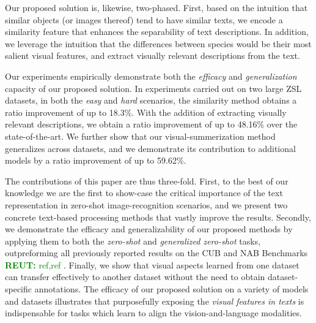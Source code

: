 \documentclass[11pt,a4paper]{article}
\newcommand\gal[1]{\textcolor{bright}{\textbf{GAL:} #1 }}
\newcommand\reut[1]{\textcolor{green}{\textbf{REUT:} #1 }}
\begin{document}
Our proposed solution is, likewise, two-phased. First,
based on the intuition that similar objects (or images thereof) tend to have similar texts,  %
we encode a similarity feature that  enhances the separability of  text descriptions. %
In addition, we leverage the intuition that the differences between species would be their most salient visual features, and extract visually relevant  descriptions from the text.



Our experiments empirically demonstrate both the {\em efficacy} and  {\em generalization} capacity of our proposed solution. 
In experiments carried out on two large ZSL datasets, %
in both the {\em easy} and {\em hard} scenarios, the similarity method obtains a ratio improvement of up to 18.3\%. With the addition of extracting visually relevant descriptions, we obtain a ratio improvement of up to 48.16\% over the state-of-the-art.
We further show that our visual-summerization method generalizes across datasets, and we demonstrate its contribution to additional models by a ratio improvement of up to 59.62\%.



The contributions of this paper are thus three-fold.
First,  to the best of our knowledge we are the first to show-case the critical importance of the text representation in zero-shot image-recognition scenarios, and we present two concrete text-based processing methods that vastly improve the results.
Secondly, we demonstrate the efficacy and generalizability of our proposed methods by applying them to both the {\em zero-shot} and {\em generalized zero-shot} tasks, outpreforming all previously reported results on the CUB and NAB Benchmarks \reut{ref,ref}. Finally, we show that visual aspects learned from one dataset can transfer effectively  to another dataset without the need to obtain dataset-specific annotations.  
The efficacy of our proposed solution on a variety of models and datasets illustrates that purposefully exposing the {\em visual features in texts} is indispensable  for tasks which learn to align the  vision-and-language modalities. %
\end{document}
